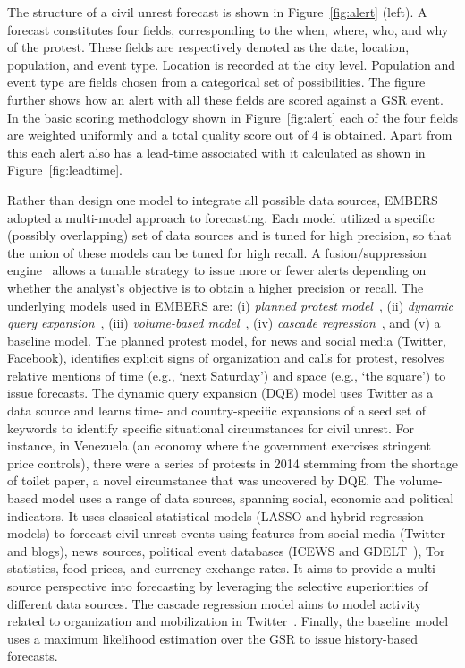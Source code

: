 \documentclass[11pt,a4paper,extrafontsizes,oneside]{article}
\begin{document}
The structure of a civil unrest forecast is shown in
Figure~\ref{fig:alert} (left).
A forecast constitutes four fields, corresponding to the when, where, who, and why
of the protest. These fields are respectively denoted as the date, location, population, and event type.
Location is recorded at the city level. Population and event type are fields chosen from a categorical
set of possibilities.  The figure further shows how an alert with all
these fields are scored against a GSR event. In the basic scoring
methodology shown in Figure~\ref{fig:alert} each of the four fields
are weighted uniformly and a total quality score out of 4 is
obtained.  Apart from this each alert also has a lead-time associated with
it calculated as shown in Figure~\ref{fig:leadtime}.

Rather than design one model to integrate all possible data sources, EMBERS adopted a multi-model
approach to forecasting. Each model utilized a specific (possibly overlapping) set of data sources
and is tuned for high precision, so that the union of these models can be tuned for high recall.
A fusion/suppression engine~\cite{andy-scotland-paper} allows a tunable
strategy to issue more or fewer
alerts depending on whether the analyst's objective is to obtain a higher
precision or recall. The underlying models used in EMBERS are: (i)
\textit{planned protest model}~\cite{pp-paper1},
(ii) \textit{dynamic query expansion}~\cite{dqe-plosone}, (iii) \textit{volume-based model}~\cite{asonam},
(iv) \textit{cascade regression}~\cite{anil-plosone}, and (v) a baseline model. The planned protest model,
for news and social media (Twitter, Facebook), identifies explicit signs of organization and calls
for protest, resolves relative mentions of time (e.g., `next Saturday') and space (e.g., `the square')
to issue forecasts. The dynamic query expansion (DQE) model uses Twitter as a data source and learns time- and country-specific
expansions of a seed set of keywords to identify specific situational circumstances for civil unrest.
For instance, in Venezuela (an economy where the government exercises stringent price controls),
there were a series of protests in 2014 stemming from the shortage of toilet paper, a novel circumstance
that was uncovered by DQE. The volume-based model uses a range of data sources, spanning
social, economic
and political indicators. It uses classical statistical models (LASSO
and hybrid regression models) to forecast civil unrest events using features
from social media (Twitter and blogs), news sources,
political event databases (ICEWS and GDELT~\cite{gdelt}), Tor~\cite{tor} statistics, food prices, and currency
exchange rates. It aims to provide a multi-source perspective into forecasting by leveraging
the selective superiorities of different data sources.  The cascade regression model
aims to model activity related to organization and mobilization in Twitter~\cite{anil-plosone}.
Finally, the baseline model uses a maximum likelihood
estimation over the GSR to issue history-based forecasts.
\end{document}
